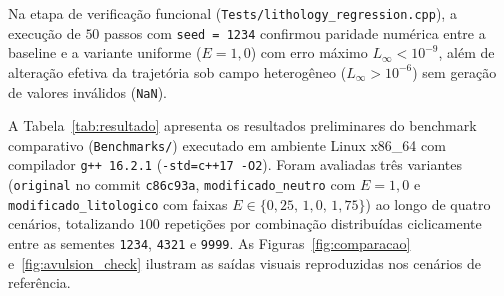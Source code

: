 \documentclass[9pt,a4paper,twocolumn]{extarticle}
\begin{document}
Na etapa de verificação funcional (\texttt{Tests/lithology\_regression.cpp}), a execução de $50$ passos com \texttt{seed = 1234} confirmou paridade numérica entre a baseline e a variante uniforme ($E=1{,}0$) com erro máximo $L_\infty < 10^{-9}$, além de alteração efetiva da trajetória sob campo heterogêneo ($L_\infty > 10^{-6}$) sem geração de valores inválidos (\texttt{NaN}).

A Tabela~\ref{tab:resultado} apresenta os resultados preliminares do benchmark comparativo (\texttt{Benchmarks/}) executado em ambiente Linux x86\_64 com compilador \texttt{g++ 16.2.1} (\texttt{-std=c++17 -O2}). Foram avaliadas três variantes (\texttt{original} no commit \texttt{c86c93a}, \texttt{modificado\_neutro} com $E=1{,}0$ e \texttt{modificado\_litologico} com faixas $E \in \{0{,}25,\, 1{,}0,\, 1{,}75\}$) ao longo de quatro cenários, totalizando $100$ repetições por combinação distribuídas ciclicamente entre as sementes \texttt{1234}, \texttt{4321} e \texttt{9999}. As Figuras~\ref{fig:comparacao} e~\ref{fig:avulsion_check} ilustram as saídas visuais reproduzidas nos cenários de referência.
\end{document}
